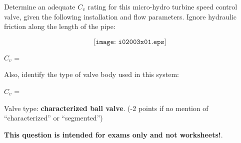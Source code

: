 

Determine an adequate $C_v$ rating for this micro-hydro turbine speed control valve, given the following installation and flow parameters.  Ignore hydraulic friction along the length of the pipe:

$$\texttt{[image: i02003x01.eps]}$$

$C_v$ = \underbar{\hskip 50pt}

\vskip 10pt

Also, identify the type of valve body used in this system:







$C_v$ = 

\vskip 10pt

Valve type: {\bf characterized ball valve}. (-2 points if no mention of ``characterized'' or ``segmented'')







{\bf This question is intended for exams only and not worksheets!}.



